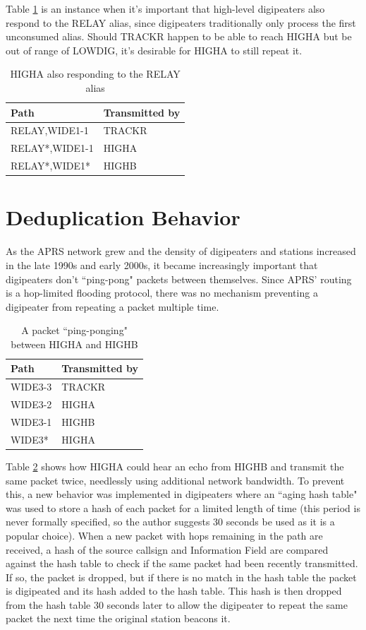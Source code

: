 Table \ref{tab:usingrelay} is an instance when it's important that high-level
digipeaters also respond to the RELAY alias, since digipeaters traditionally
only process the first unconsumed alias.
Should TRACKR happen to be able to reach HIGHA but be out of range of LOWDIG,
it's desirable for HIGHA to still repeat it.
\begin{table}[!h]
	\centering
	\begin{tabular}{ | l | l | }
		\hline
		Path & Transmitted by \\ \hline
		RELAY,WIDE1-1 & TRACKR \\ \hline
		RELAY*,WIDE1-1 & HIGHA \\ \hline
		RELAY*,WIDE1* & HIGHB \\ \hline
	\end{tabular}
	\caption{HIGHA also responding to the RELAY alias}
	\label{tab:usingrelay}
\end{table}

\section{Deduplication Behavior}

As the APRS network grew and the density of digipeaters and stations increased
in the late 1990s and early 2000s,
it became increasingly important that digipeaters don't ``ping-pong" packets
between themselves.
Since APRS' routing is a hop-limited flooding protocol,
there was no mechanism preventing a digipeater from repeating a packet multiple
time.
\begin{table}[!h]
	\centering
	\begin{tabular}{ | l | l | }
		\hline
		Path & Transmitted by \\ \hline
		WIDE3-3 & TRACKR \\ \hline
		WIDE3-2 & HIGHA \\ \hline
		WIDE3-1 & HIGHB \\ \hline
		WIDE3* & HIGHA \\ \hline
	\end{tabular}
	\caption{A packet ``ping-ponging" between HIGHA and HIGHB}
	\label{tab:widepingpong}
\end{table}

Table \ref{tab:widepingpong} shows how HIGHA could hear an echo from HIGHB
and transmit the same packet twice, needlessly using additional network bandwidth.
To prevent this, a new behavior was implemented in digipeaters where an
``aging hash table" was used to store a hash of each packet for a limited
length of time (this period is never formally specified, so the author
suggests 30 seconds be used as it is a popular choice).
When a new packet with hops remaining in the path are received,
a hash of the source callsign and Information Field are compared against
the hash table to check if the same packet had been recently transmitted.
If so, the packet is dropped, but if there is no match in the hash table
the packet is digipeated and its hash added to the hash table.
This hash is then dropped from the hash table 30 seconds later to allow
the digipeater to repeat the same packet the next time the original station
beacons it.

